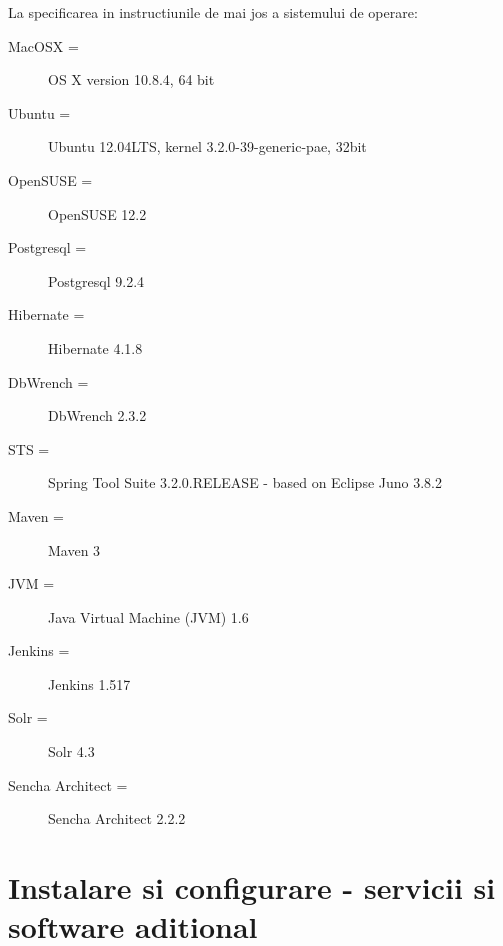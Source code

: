La specificarea in instructiunile de mai jos a sistemului de operare:
\begin{description} 
\item [MacOSX =] OS X version 10.8.4, 64 bit
\item [Ubuntu =] Ubuntu 12.04LTS, kernel 3.2.0-39-generic-pae, 32bit
\item [OpenSUSE = ] OpenSUSE 12.2
\item [Postgresql =] Postgresql 9.2.4
\item [Hibernate =] Hibernate 4.1.8
\item [DbWrench =] DbWrench 2.3.2
\item [STS =] Spring Tool Suite 3.2.0.RELEASE - based on Eclipse Juno 3.8.2
\item [Maven =] Maven 3
\item [JVM =] Java Virtual Machine (JVM) 1.6
\item [Jenkins =] Jenkins 1.517
\item [Solr =] Solr 4.3
\item [Sencha Architect =] Sencha Architect 2.2.2
\end{description}

\section{Instalare si configurare - servicii si software aditional}

